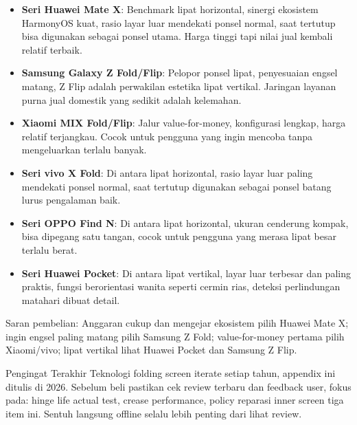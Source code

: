 \begin{itemize}
  \item \textbf{Seri Huawei Mate X}: Benchmark lipat horizontal, sinergi ekosistem HarmonyOS kuat, rasio layar luar mendekati ponsel normal, saat tertutup bisa digunakan sebagai ponsel utama. Harga tinggi tapi nilai jual kembali relatif terbaik.
  \item \textbf{Samsung Galaxy Z Fold/Flip}: Pelopor ponsel lipat, penyesuaian engsel matang, Z Flip adalah perwakilan estetika lipat vertikal. Jaringan layanan purna jual domestik yang sedikit adalah kelemahan.
  \item \textbf{Xiaomi MIX Fold/Flip}: Jalur value-for-money, konfigurasi lengkap, harga relatif terjangkau. Cocok untuk pengguna yang ingin mencoba tanpa mengeluarkan terlalu banyak.
  \item \textbf{Seri vivo X Fold}: Di antara lipat horizontal, rasio layar luar paling mendekati ponsel normal, saat tertutup digunakan sebagai ponsel batang lurus pengalaman baik.
  \item \textbf{Seri OPPO Find N}: Di antara lipat horizontal, ukuran cenderung kompak, bisa dipegang satu tangan, cocok untuk pengguna yang merasa lipat besar terlalu berat.
  \item \textbf{Seri Huawei Pocket}: Di antara lipat vertikal, layar luar terbesar dan paling praktis, fungsi berorientasi wanita seperti cermin rias, deteksi perlindungan matahari dibuat detail.
\end{itemize}

Saran pembelian: Anggaran cukup dan mengejar ekosistem pilih Huawei Mate X; ingin engsel paling matang pilih Samsung Z Fold; value-for-money pertama pilih Xiaomi/vivo; lipat vertikal lihat Huawei Pocket dan Samsung Z Flip.

\begin{tcbinfo}{Pengingat Terakhir}
Teknologi folding screen iterate setiap tahun, appendix ini ditulis di 2026. Sebelum beli pastikan cek review terbaru dan feedback user, fokus pada: hinge life actual test, crease performance, policy reparasi inner screen tiga item ini. Sentuh langsung offline selalu lebih penting dari lihat review.

\end{tcbinfo}
